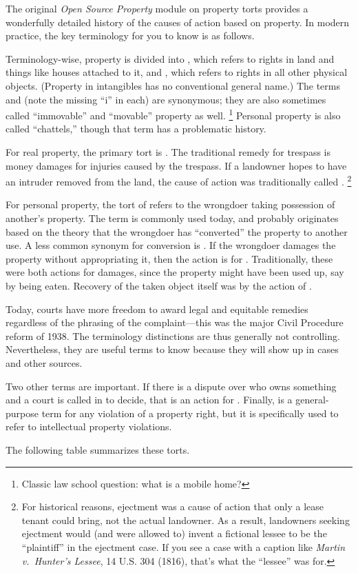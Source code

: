 The original \emph{Open Source Property} module on property torts provides a
wonderfully detailed history of the causes of action based on property. In
modern practice, the key terminology for you to know is as follows.

Terminology-wise, property is divided into , which refers to
rights in land and things like houses attached to it, and , which refers to rights in all other physical objects. (Property in
intangibles has no conventional general name.) The terms  and
 (note the missing ``i'' in each) are synonymous; they are also
sometimes called ``immovable'' and ``movable'' property as well.
\unskip\footnote{Classic law school question: what is a mobile home?}
Personal property is also called ``chattels,'' though that term has a
problematic history.

For real property, the primary tort is . The traditional remedy
for trespass is money damages for injuries caused by the trespass. If a
landowner hopes to have an intruder removed from the land, the cause of action
was traditionally called . \unskip\footnote{For historical
reasons, ejectment was a cause of action that only a lease tenant could bring,
not the actual landowner. As a result, landowners seeking ejectment would (and
were allowed to) invent a fictional lessee to be the ``plaintiff'' in the
ejectment case. If you see a case with a caption like \emph{Martin v.~Hunter's
Lessee}, 14 U.S. 304 (1816), that's what the ``lessee'' was for.}

For personal property, the tort of  refers to the wrongdoer
taking possession of another's property. The term is commonly used today, and
probably originates based on the theory that the wrongdoer has ``converted'' the
property to another use. A less common synonym for conversion is .
If the wrongdoer damages the property without appropriating it, then the action
is for . Traditionally, these were both actions for
damages, since the property might have been used up, say by being eaten.
Recovery of the taken object itself was by the action of .

Today, courts have more freedom to award legal and equitable remedies regardless
of the phrasing of the complaint---this was the major Civil Procedure reform of
1938. The terminology distinctions are thus generally not controlling.
Nevertheless, they are useful terms to know because they will show up in cases
and other sources.

Two other terms are important. If there is a dispute over who owns something and
a court is called in to decide, that is an action for .
Finally,  is a general-purpose term for any violation of a
property right, but it is specifically used to refer to intellectual property
violations.

The following table summarizes these torts.

